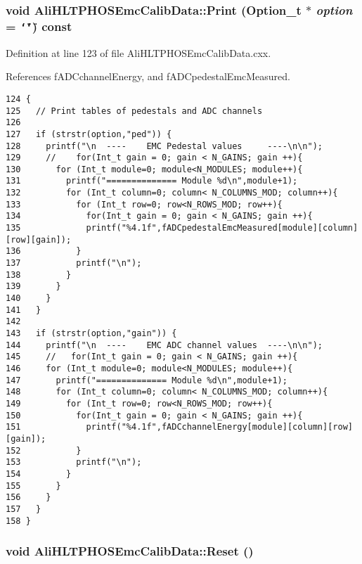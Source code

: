 \subsubsection{\setlength{\rightskip}{0pt plus 5cm}void Ali\-HLTPHOSEmc\-Calib\-Data::Print (Option\_\-t $\ast$ {\em option} = {\tt \char`\"{}\char`\"{}}) const\hspace{0.3cm}{\tt  [virtual]}}\label{classAliHLTPHOSEmcCalibData_a6}




Definition at line 123 of file Ali\-HLTPHOSEmc\-Calib\-Data.cxx.

References f\-ADCchannel\-Energy, and f\-ADCpedestal\-Emc\-Measured.

\footnotesize\begin{verbatim}124 {
125   // Print tables of pedestals and ADC channels
126 
127   if (strstr(option,"ped")) {
128     printf("\n  ----    EMC Pedestal values     ----\n\n");
129     //    for(Int_t gain = 0; gain < N_GAINS; gain ++){
130       for (Int_t module=0; module<N_MODULES; module++){
131         printf("============== Module %d\n",module+1);
132         for (Int_t column=0; column< N_COLUMNS_MOD; column++){
133           for (Int_t row=0; row<N_ROWS_MOD; row++){
134             for(Int_t gain = 0; gain < N_GAINS; gain ++){
135             printf("%4.1f",fADCpedestalEmcMeasured[module][column][row][gain]);
136           }
137           printf("\n");
138         }
139       }
140     }
141   }
142 
143   if (strstr(option,"gain")) {
144     printf("\n  ----    EMC ADC channel values  ----\n\n");
145     //   for(Int_t gain = 0; gain < N_GAINS; gain ++){ 
146     for (Int_t module=0; module<N_MODULES; module++){
147       printf("============== Module %d\n",module+1);
148       for (Int_t column=0; column< N_COLUMNS_MOD; column++){
149         for (Int_t row=0; row<N_ROWS_MOD; row++){
150           for(Int_t gain = 0; gain < N_GAINS; gain ++){ 
151             printf("%4.1f",fADCchannelEnergy[module][column][row][gain]);
152           }
153           printf("\n");
154         }
155       }
156     }  
157   }
158 }
\end{verbatim}\normalsize 


\subsubsection{\setlength{\rightskip}{0pt plus 5cm}void Ali\-HLTPHOSEmc\-Calib\-Data::Reset ()}\label{classAliHLTPHOSEmcCalibData_a5}




